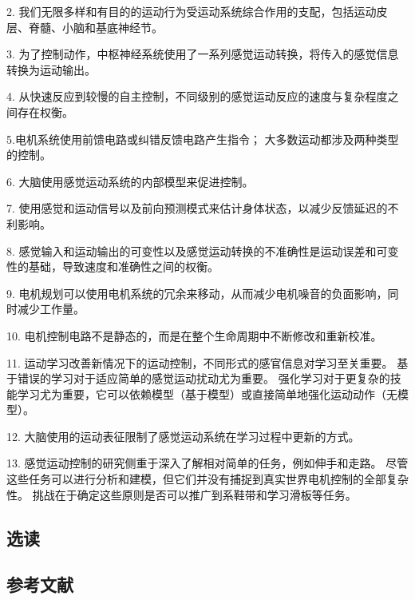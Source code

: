 2. 我们无限多样和有目的的运动行为受运动系统综合作用的支配，包括运动皮层、脊髓、小脑和基底神经节。

3. 为了控制动作，中枢神经系统使用了一系列感觉运动转换，将传入的感觉信息转换为运动输出。

4. 从快速反应到较慢的自主控制，不同级别的感觉运动反应的速度与复杂程度之间存在权衡。

5.电机系统使用前馈电路或纠错反馈电路产生指令； 大多数运动都涉及两种类型的控制。

6. 大脑使用感觉运动系统的内部模型来促进控制。

7. 使用感觉和运动信号以及前向预测模式来估计身体状态，以减少反馈延迟的不利影响。

8. 感觉输入和运动输出的可变性以及感觉运动转换的不准确性是运动误差和可变性的基础，导致速度和准确性之间的权衡。

9. 电机规划可以使用电机系统的冗余来移动，从而减少电机噪音的负面影响，同时减少工作量。

10. 电机控制电路不是静态的，而是在整个生命周期中不断修改和重新校准。

11. 运动学习改善新情况下的运动控制，不同形式的感官信息对学习至关重要。 基于错误的学习对于适应简单的感觉运动扰动尤为重要。 强化学习对于更复杂的技能学习尤为重要，它可以依赖模型（基于模型）或直接简单地强化运动动作（无模型）。

12. 大脑使用的运动表征限制了感觉运动系统在学习过程中更新的方式。

13. 感觉运动控制的研究侧重于深入了解相对简单的任务，例如伸手和走路。 尽管这些任务可以进行分析和建模，但它们并没有捕捉到真实世界电机控制的全部复杂性。 挑战在于确定这些原则是否可以推广到系鞋带和学习滑板等任务。

\subsection{选读}
\subsection{参考文献}

